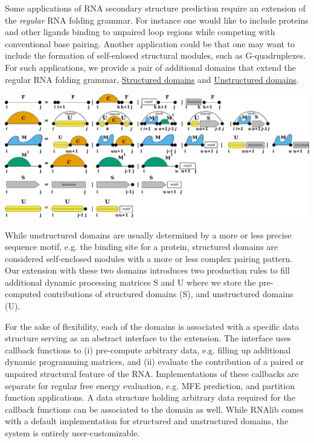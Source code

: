 Some applications of R\+NA secondary structure prediction require an extension of the {\itshape regular} R\+NA folding grammar. For instance one would like to include proteins and other ligands binding to unpaired loop regions while competing with conventional base pairing. Another application could be that one may want to include the formation of self-\/enlosed structural modules, such as G-\/quadruplexes. For such applications, we provide a pair of additional domains that extend the regular R\+NA folding grammar, \hyperlink{group__domains__struc}{Structured domains} and \hyperlink{group__domains__up}{Unstructured domains}.

 
\begin{DoxyImageNoCaption}
  \mbox{\includegraphics[width=\textwidth,height=\textheight/2,keepaspectratio=true]{GCrecursion}}
\end{DoxyImageNoCaption}


While unstructured domains are usually determined by a more or less precise sequence motif, e.\+g. the binding site for a protein, structured domains are considered self-\/enclosed modules with a more or less complex pairing pattern. Our extension with these two domains introduces two production rules to fill additional dynamic processing matrices {\ttfamily S} and {\ttfamily U} where we store the pre-\/computed contributions of structured domains ({\ttfamily S}), and unstructured domains ({\ttfamily U}).

For the sake of flexibility, each of the domains is associated with a specific data structure serving as an abstract interface to the extension. The interface uses callback functions to (i) pre-\/compute arbitrary data, e.\+g. filling up additional dynamic programming matrices, and (ii) evaluate the contribution of a paired or unpaired structural feature of the R\+NA. Implementations of these callbacks are separate for regular free energy evaluation, e.\+g. M\+FE prediction, and partition function applications. A data structure holding arbitrary data required for the callback functions can be associated to the domain as well. While R\+N\+Alib comes with a default implementation for structured and unstructured domains, the system is entirely user-\/customizable. 
